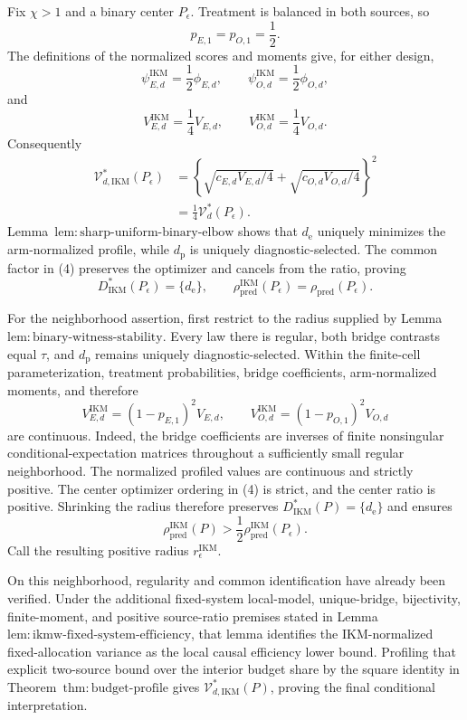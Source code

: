 Fix \(\chi>1\) and a binary center \(P_\epsilon\).  Treatment is balanced in both sources, so
\[
 p_{E,1}=p_{O,1}=\frac12.                                 \tag{1}
\]
The definitions of the normalized scores and moments give, for either design,
\[
 \psi_{E,d}^{\mathrm{IKM}}=\frac12\phi_{E,d},
 \qquad
 \psi_{O,d}^{\mathrm{IKM}}=\frac12\phi_{O,d},            \tag{2}
\]
and
\[
 V_{E,d}^{\mathrm{IKM}}=\frac14V_{E,d},
 \qquad
 V_{O,d}^{\mathrm{IKM}}=\frac14V_{O,d}.                  \tag{3}
\]
Consequently
\[
\begin{aligned}
 \mathcal V_{d,\mathrm{IKM}}^*(P_\epsilon)
 &=\left\{\sqrt{c_{E,d}V_{E,d}/4}
 +\sqrt{c_{O,d}V_{O,d}/4}\right\}^2\\
 &=\frac14\mathcal V_d^*(P_\epsilon).                   \tag{4}
\end{aligned}
\]
Lemma~\(\mathrm{lem{:}sharp\text{-}uniform\text{-}binary\text{-}elbow}\) shows that \(d_{\mathrm e}\) uniquely minimizes the arm-normalized profile, while \(d_{\mathrm p}\) is uniquely diagnostic-selected.  The common factor in (4) preserves the optimizer and cancels from the ratio, proving
\[
 D_{\mathrm{IKM}}^*(P_\epsilon)=\{d_{\mathrm e}\},
 \qquad
 \rho_{\mathrm{pred}}^{\mathrm{IKM}}(P_\epsilon)
 =\rho_{\mathrm{pred}}(P_\epsilon).                     \tag{5}
\]

For the neighborhood assertion, first restrict to the radius supplied by Lemma~\(\mathrm{lem{:}binary\text{-}witness\text{-}stability}\).  Every law there is regular, both bridge contrasts equal \(\tau\), and \(d_{\mathrm p}\) remains uniquely diagnostic-selected.  Within the finite-cell parameterization, treatment probabilities, bridge coefficients, arm-normalized moments, and therefore
\[
 V_{E,d}^{\mathrm{IKM}}=(1-p_{E,1})^2V_{E,d},
 \qquad
 V_{O,d}^{\mathrm{IKM}}=(1-p_{O,1})^2V_{O,d}             \tag{6}
\]
are continuous.  Indeed, the bridge coefficients are inverses of finite nonsingular conditional-expectation matrices throughout a sufficiently small regular neighborhood.  The normalized profiled values are continuous and strictly positive.  The center optimizer ordering in (4) is strict, and the center ratio is positive.  Shrinking the radius therefore preserves \(D_{\mathrm{IKM}}^*(P)=\{d_{\mathrm e}\}\) and ensures
\[
 \rho_{\mathrm{pred}}^{\mathrm{IKM}}(P)
 >\frac12\rho_{\mathrm{pred}}^{\mathrm{IKM}}(P_\epsilon).
\]
Call the resulting positive radius \(r_\epsilon^{\mathrm{IKM}}\).

On this neighborhood, regularity and common identification have already been verified.  Under the additional fixed-system local-model, unique-bridge, bijectivity, finite-moment, and positive source-ratio premises stated in Lemma~\(\mathrm{lem{:}ikmw\text{-}fixed\text{-}system\text{-}efficiency}\), that lemma identifies the IKM-normalized fixed-allocation variance as the local causal efficiency lower bound.  Profiling that explicit two-source bound over the interior budget share by the square identity in Theorem~\(\mathrm{thm{:}budget\text{-}profile}\) gives \(\mathcal V_{d,\mathrm{IKM}}^*(P)\), proving the final conditional interpretation.
